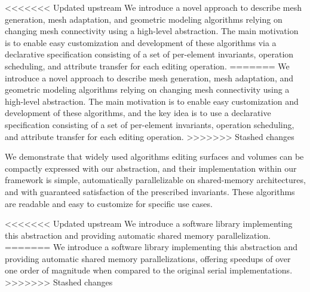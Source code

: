 
<<<<<<< Updated upstream
We introduce a novel approach to describe mesh generation, mesh adaptation, and geometric modeling algorithms relying on changing mesh connectivity using a high-level abstraction. The main motivation is to enable easy customization and development of these algorithms via a declarative specification consisting of a set of per-element invariants, operation scheduling, and attribute transfer for each editing operation.
=======
We introduce a novel approach to describe mesh generation, mesh adaptation, and geometric modeling algorithms relying on changing mesh connectivity using a high-level abstraction. The main motivation is to enable easy customization and development of these algorithms, and the key idea is to use a declarative specification consisting of a set of per-element invariants, operation scheduling, and attribute transfer for each editing operation.
>>>>>>> Stashed changes

We demonstrate that widely used algorithms editing surfaces and volumes can be compactly expressed with our abstraction, and their implementation within our framework is simple, automatically parallelizable on shared-memory architectures, and with guaranteed satisfaction of the prescribed invariants. These algorithms are readable and easy to customize for specific use cases.

<<<<<<< Updated upstream
We introduce a software library implementing this abstraction and providing automatic shared memory parallelization.
=======
We introduce a software library implementing this abstraction and providing automatic shared memory parallelizations, offering speedups of over one order of magnitude when compared to the original serial implementations.
>>>>>>> Stashed changes
